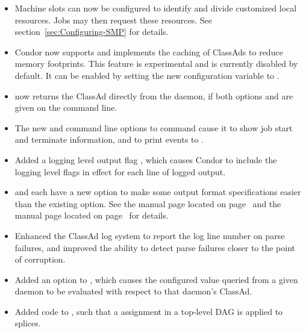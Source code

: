 \begin{itemize}

\item Machine slots can now be configured to identify and
divide customized local resources.
Jobs may then request these resources.
See section~\ref{sec:Configuring-SMP} for details.

\item Condor now supports and implements the caching of ClassAds 
to reduce memory footprints. 
This feature is experimental and is currently disabled by default.
It can be enabled by setting
the new configuration variable 
to .

\item {} now returns the  ClassAd directly 
from the  daemon,
if both options  and  are given on the command line.

\item The new  and  command line options to 
 command cause it to show job start and terminate information,
and to print events to .

\item Added a  logging level output flag ,
which causes Condor to include the logging level
flags in effect for each line of logged output.

\item {} and  each have a new  option
to make some output format specifications easier than the existing
 option.
See the  manual page located on page~\pageref{man-condor-status}
and the  manual page located on page~\pageref{man-condor-q} 
for details.

\item Enhanced the ClassAd log system to report the log line number 
on parse failures, 
and improved the ability to detect parse failures closer to 
the point of corruption.

\item Added an  option to , which causes the configured value queried from
a given daemon to be evaluated with respect to that daemon's ClassAd.

\item Added code to ,
such that a  assignment in a top-level DAG is applied to splices.


\end{itemize}
